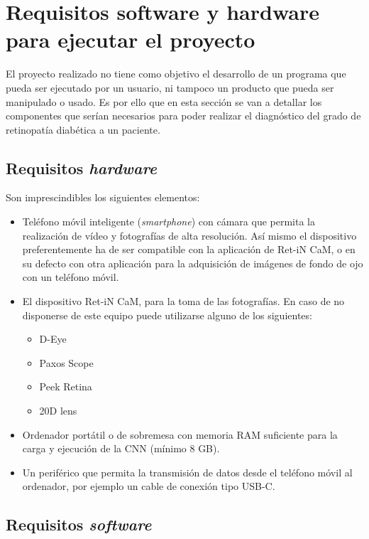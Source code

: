 
\section{Requisitos software y hardware para ejecutar el proyecto}

El proyecto realizado no tiene como objetivo el desarrollo de un programa que pueda ser ejecutado por un usuario, ni tampoco un producto que pueda ser manipulado o usado. Es por ello que en esta sección se van a detallar los componentes que serían necesarios para poder realizar el diagnóstico del grado de retinopatía diabética a un paciente.

\subsection{Requisitos \textit{hardware}}

Son imprescindibles los siguientes elementos:

\begin{itemize}
    \item Teléfono móvil inteligente (\textit{smartphone}) con cámara que permita la realización de vídeo y fotografías de alta resolución. Así mismo el dispositivo preferentemente ha de ser compatible con la aplicación de Ret-iN CaM, o en su defecto con otra aplicación para la adquisición de imágenes de fondo de ojo con un teléfono móvil.
    \item El dispositivo Ret-iN CaM, para la toma de las fotografías. En caso de no disponerse de este equipo puede utilizarse alguno de los siguientes:
    \begin{itemize}
        \item D-Eye
        \item Paxos Scope
        \item Peek Retina
        \item 20D lens
    \end{itemize}
    \item Ordenador portátil o de sobremesa con memoria RAM suficiente para la carga y ejecución de la CNN (mínimo 8 GB).
    \item Un periférico que permita la transmisión de datos desde el teléfono móvil al ordenador, por ejemplo un cable de conexión tipo USB-C.
\end{itemize}

\subsection{Requisitos \textit{software}}

